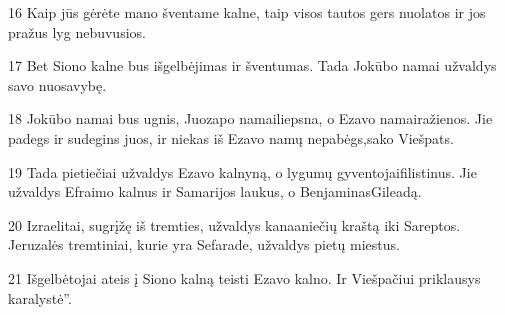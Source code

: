 \par 16 Kaip jūs gėrėte mano šventame kalne, taip visos tautos gers nuolatos ir jos pražus lyg nebuvusios. 
\par 17 Bet Siono kalne bus išgelbėjimas ir šventumas. Tada Jokūbo namai užvaldys savo nuosavybę. 
\par 18 Jokūbo namai bus ugnis, Juozapo namai­liepsna, o Ezavo namai­ražienos. Jie padegs ir sudegins juos, ir niekas iš Ezavo namų nepabėgs,­sako Viešpats.­ 
\par 19 Tada pietiečiai užvaldys Ezavo kalnyną, o lygumų gyventojai­filistinus. Jie užvaldys Efraimo kalnus ir Samarijos laukus, o Benjaminas­Gileadą. 
\par 20 Izraelitai, sugrįžę iš tremties, užvaldys kanaaniečių kraštą iki Sareptos. Jeruzalės tremtiniai, kurie yra Sefarade, užvaldys pietų miestus. 
\par 21 Išgelbėtojai ateis į Siono kalną teisti Ezavo kalno. Ir Viešpačiui priklausys karalystė”.



